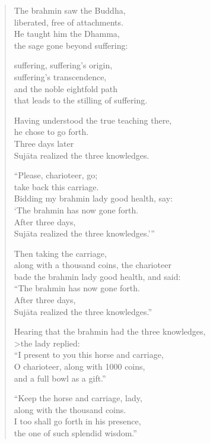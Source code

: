 \documentclass[12pt,openany]{book}%
\begin{document}
\begin{verse}
The brahmin saw the Buddha, \\
liberated, free of attachments. \\
He taught him the Dhamma, \\
the sage gone beyond suffering: 

suffering, suffering’s origin, \\
suffering’s transcendence, \\
and the noble eightfold path \\
that leads to the stilling of suffering. 

Having understood the true teaching there, \\
he chose to go forth. \\
Three days later \\
\textsanskrit{Sujāta} realized the three knowledges. 

“Please, charioteer, go; \\
take back this carriage. \\
Bidding my brahmin lady good health, say: \\
‘The brahmin has now gone forth. \\
After three days, \\
\textsanskrit{Sujāta} realized the three knowledges.’” 

Then taking the carriage, \\
along with a thousand coins, the charioteer \\
bade the brahmin lady good health, and said: \\
“The brahmin has now gone forth. \\
After three days, \\
\textsanskrit{Sujāta} realized the three knowledges.” 

Hearing that the brahmin had the three knowledges, \\>the lady replied: \\
“I present to you this horse and carriage, \\
O charioteer, along with 1000 coins, \\
and a full bowl as a gift.” 

“Keep the horse and carriage, lady, \\
along with the thousand coins. \\
I too shall go forth in his presence, \\
the one of such splendid wisdom.” 


\end{verse}
\end{document}
